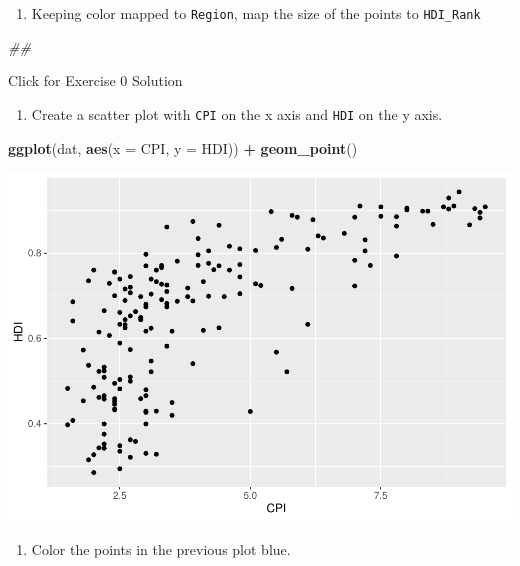 \documentclass[
]{book}
\newenvironment{Shaded}{\begin{snugshade}}{\end{snugshade}}
\newcommand{\CommentTok}[1]{\textcolor[rgb]{0.56,0.35,0.01}{\textit{#1}}}
\newcommand{\DataTypeTok}[1]{\textcolor[rgb]{0.13,0.29,0.53}{#1}}
\newcommand{\KeywordTok}[1]{\textcolor[rgb]{0.13,0.29,0.53}{\textbf{#1}}}
\newcommand{\NormalTok}[1]{#1}
\newcommand{\OperatorTok}[1]{\textcolor[rgb]{0.81,0.36,0.00}{\textbf{#1}}}
\newcommand{\StringTok}[1]{\textcolor[rgb]{0.31,0.60,0.02}{#1}}
\providecommand{\tightlist}{%
  \setlength{\itemsep}{0pt}\setlength{\parskip}{0pt}}
\begin{document}
\begin{enumerate}
\def\labelenumi{\arabic{enumi}.}
\setcounter{enumi}{4}
\tightlist
\item
  Keeping color mapped to \texttt{Region}, map the size of the points to \texttt{HDI\_Rank}
\end{enumerate}

\begin{Shaded}
\begin{Highlighting}[]
\CommentTok{\#\# }
\end{Highlighting}
\end{Shaded}

{Click for Exercise 0 Solution}

\begin{alert}

\begin{enumerate}
\def\labelenumi{\arabic{enumi}.}
\tightlist
\item
  Create a scatter plot with \texttt{CPI} on the x axis and \texttt{HDI} on the y axis.
\end{enumerate}

\begin{Shaded}
\begin{Highlighting}[]
\KeywordTok{ggplot}\NormalTok{(dat, }\KeywordTok{aes}\NormalTok{(}\DataTypeTok{x =}\NormalTok{ CPI, }\DataTypeTok{y =}\NormalTok{ HDI)) }\OperatorTok{+}
\StringTok{  }\KeywordTok{geom\_point}\NormalTok{()}
\end{Highlighting}
\end{Shaded}

\includegraphics{R/Rgraphics/figures/unnamed-chunk-159-1.pdf}

\begin{enumerate}
\def\labelenumi{\arabic{enumi}.}
\setcounter{enumi}{1}
\tightlist
\item
  Color the points in the previous plot blue.
\end{enumerate}


\end{alert}
\end{document}

